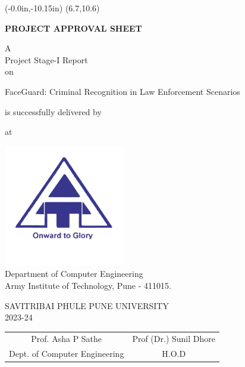 \thisfancyput(-0.0in,-10.15in){
	\setlength{\unitlength}{1in}
	\framebox(6.7,10.6)
}
\setlength{\parindent}{0mm}
\begin{center}
	\vspace*{0.5 \baselineskip}

	{
		\bfseries
		PROJECT APPROVAL SHEET
		\vspace*{1.5 \baselineskip}
	}
		
	A \\ Project Stage-I Report \\ on
	\vspace*{1.5 \baselineskip}

	FaceGuard: Criminal Recognition in Law Enforcement Scenarios
	\vspace*{1.5\baselineskip}

	is successfully delivered by
	
	\vspace*{\baselineskip}

	\nametable
	
	\vspace*{\baselineskip}
	
	at

	\vspace*{\baselineskip}

	\includegraphics[scale=0.75]{components/images/logo.png} \\[0.5cm]
	
	Department of Computer Engineering \\
	Army Institute of Technology, Pune - 411015.\\
	\vspace*{0.5\baselineskip}
	
	SAVITRIBAI PHULE PUNE UNIVERSITY \\
	2023-24
\end{center}

\vspace*{3\baselineskip}

\begin{table}[h!]
	\centering
	\begin{tabular}{ c c }
		Prof. Asha P Sathe \hspace{35mm} & Prof (Dr.) Sunil Dhore \\
		Dept. of Computer Engineering \hspace{35mm} & H.O.D
	\end{tabular}
\end{table}

\pagebreak
